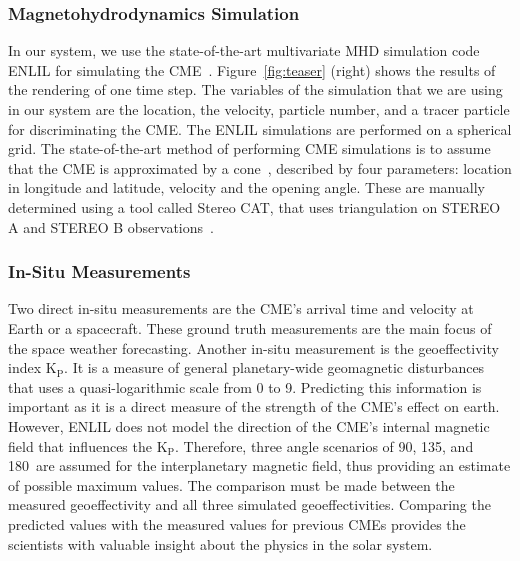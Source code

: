 \documentclass[journal]{vgtc}                %
\newcommand{\kpIndex}{$\textrm{K}_\textrm{P}$}
\begin{document}
\subsubsection{Magnetohydrodynamics Simulation} \label{sec:mhd}
In our system, we use the state-of-the-art multivariate MHD simulation code ENLIL for simulating the CME~\cite{odstrcil2002merging}. Figure~\ref{fig:teaser} (right) shows the results of the rendering of one time step. The variables of the simulation that we are using in our system are the location, the velocity, particle number, and a tracer particle for discriminating the CME. The ENLIL simulations are performed on a spherical grid. The state-of-the-art method of performing CME simulations is to assume that the CME is approximated by a cone~\cite{Arge:2000jz}, described by four parameters: location in longitude and latitude, velocity and the opening angle. These are manually determined using a tool called Stereo CAT, that uses triangulation on STEREO A and STEREO B observations~\cite{Millward:2013cm}.%


\subsubsection{In-Situ Measurements} \label{sec:insitu}
Two direct in-situ measurements are the CME's arrival time and velocity at Earth or a spacecraft. These ground truth measurements are the main focus of the space weather forecasting. Another in-situ measurement is the geoeffectivity index \kpIndex. It is a measure of general planetary-wide geomagnetic disturbances that uses a quasi-logarithmic scale from 0 to 9. Predicting this information is important as it is a direct measure of the strength of the CME's effect on earth. However, ENLIL does not model the direction of the CME's internal magnetic field that influences the \kpIndex . Therefore, three angle scenarios of 90\degree , 135\degree , and 180\degree\ are assumed for the interplanetary magnetic field, thus providing an estimate of possible maximum values. The comparison must be made between the measured geoeffectivity and all three simulated geoeffectivities. Comparing the predicted values with the measured values for previous CMEs provides the scientists with valuable insight about the physics in the solar system. 
\end{document}

